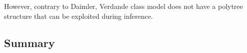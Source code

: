However, contrary to Daimler, Verdande class model does not have a polytree structure that can be exploited during inference. 


\subsection{Summary}

 



%
